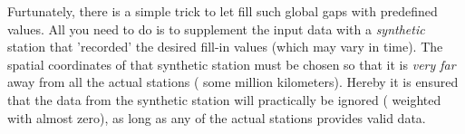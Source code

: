 Furtunately, there is a simple trick to let  fill such global gaps with predefined values. All you need to do is to supplement the input data with a \emph{synthetic} station that 'recorded' the desired fill-in values (which may vary in time). The spatial coordinates of that synthetic station must be chosen so that it is \emph{very far} away from all the actual stations (\eg{} some million kilometers). Hereby it is ensured that the data from the synthetic station will practically be ignored (\ie{} weighted with almost zero), as long as any of the actual stations provides valid data.
